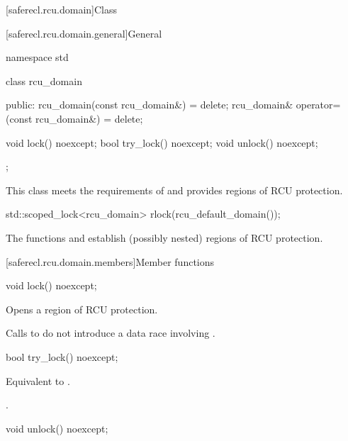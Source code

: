 [saferecl.rcu.domain]{Class }

[saferecl.rcu.domain.general]{General}

\begin{codeblock}
namespace std {
  class rcu_domain {
  public:
    rcu_domain(const rcu_domain&) = delete;
    rcu_domain& operator=(const rcu_domain&) = delete;

    void lock() noexcept;
    bool try_lock() noexcept;
    void unlock() noexcept;
  };
}
\end{codeblock}

\pnum
This class meets the requirements of
 and
provides regions of RCU protection.
\begin{example}
\begin{codeblock}
std::scoped_lock<rcu_domain> rlock(rcu_default_domain());
\end{codeblock}
\end{example}

\pnum
The functions  and  establish
(possibly nested) regions of RCU protection.

[saferecl.rcu.domain.members]{Member functions}

%
\begin{itemdecl}
void lock() noexcept;
\end{itemdecl}

\begin{itemdescr}
\pnum
\effects
Opens a region of RCU protection.

\pnum
\remarks
Calls to 
do not introduce a data race involving .
\end{itemdescr}

%
\begin{itemdecl}
bool try_lock() noexcept;
\end{itemdecl}

\begin{itemdescr}
\pnum
\effects
Equivalent to .

\pnum
\returns
{}.
\end{itemdescr}

%
\begin{itemdecl}
void unlock() noexcept;
\end{itemdecl}


